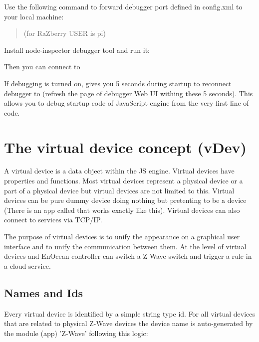 Use the following command to forward debugger port defined in config.xml to your local machine:
\begin{quote} 
(for RaZberry USER is pi)
\end{quote} 


Install node-inspector debugger tool and run it:
\begin{quote} 
\end{quote} 

Then you can connect to 


If debugging is turned on, \zway gives you 5 seconds during startup to reconnect debugger to 
\zway (refresh the page of debugger Web UI withing these 5 seconds).
This allows you to debug startup code of \zway JavaScript engine from the very first line of code.

\section{The virtual device concept (vDev)}
\label{cap:vdev}

A virtual device is a data object within the JS engine. Virtual devices have 
properties and functions. Most virtual devices represent a physical device or a part of 
a physical device but virtual devices are not limited to this. Virtual devices can be 
pure dummy device doing nothing but pretenting to be a device (There is an app called
 that works exactly like this). Virtual devices can also connect to
services via TCP/IP.

The purpose of virtual devices is to unify the appearance on a graphical user interface 
and to unify the communication between them. At the level of virtual devices 
and EnOcean controller can switch a Z-Wave switch and trigger a rule in a cloud 
service.
 
\subsection{Names and Ids}

Every virtual device is identified by a simple string type id. For all virtual devices 
that are related to physical Z-Wave devices the device name is auto-generated by the 
module (app) 'Z-Wave' following this logic:

